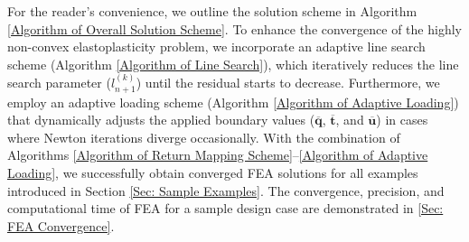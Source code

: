 \documentclass[preprint,11pt]{elsarticle}
\theoremstyle{definition}
\begin{document}
For the reader's convenience, we outline the solution scheme in Algorithm \ref{Algorithm of Overall Solution Scheme}. To enhance the convergence of the highly non-convex elastoplasticity problem, we incorporate an adaptive line search scheme (Algorithm \ref{Algorithm of Line Search}), which iteratively reduces the line search parameter ($l_{n+1}^{(k)}$) until the residual starts to decrease. Furthermore, we employ an adaptive loading scheme (Algorithm \ref{Algorithm of Adaptive Loading}) that dynamically adjusts the applied boundary values ($\overline{\mathbf{q}}$, $\overline{\mathbf{t}}$, and $\overline{\mathbf{u}}$) in cases where Newton iterations diverge occasionally. With the combination of Algorithms \ref{Algorithm of Return Mapping Scheme}–\ref{Algorithm of Adaptive Loading}, we successfully obtain converged FEA solutions for all examples introduced in Section \ref{Sec: Sample Examples}. The convergence, precision, and computational time of FEA for a sample design case are demonstrated in \ref{Sec: FEA Convergence}.
\end{document}
